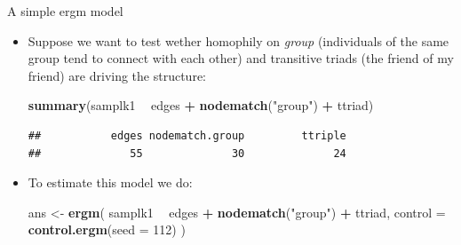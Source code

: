\documentclass[10pt,ignorenonframetext,aspectratio=169,]{beamer}
\newenvironment{Shaded}{\begin{snugshade}}{\end{snugshade}}
\newcommand{\DataTypeTok}[1]{\textcolor[rgb]{0.13,0.29,0.53}{#1}}
\newcommand{\DecValTok}[1]{\textcolor[rgb]{0.00,0.00,0.81}{#1}}
\newcommand{\KeywordTok}[1]{\textcolor[rgb]{0.13,0.29,0.53}{\textbf{#1}}}
\newcommand{\NormalTok}[1]{#1}
\newcommand{\OperatorTok}[1]{\textcolor[rgb]{0.81,0.36,0.00}{\textbf{#1}}}
\newcommand{\StringTok}[1]{\textcolor[rgb]{0.31,0.60,0.02}{#1}}
\begin{document}
\begin{frame}[fragile]{A simple ergm model}
\protect\hypertarget{a-simple-ergm-model}{}

\begin{itemize}
\item
  Suppose we want to test wether homophily on \textit{group}
  (individuals of the same group tend to connect with each other) and
  transitive triads (the friend of my friend) are driving the structure:
  \pause

  \footnotesize

\begin{Shaded}
\begin{Highlighting}[]
\KeywordTok{summary}\NormalTok{(samplk1 }\OperatorTok{~}\StringTok{ }\NormalTok{edges }\OperatorTok{+}\StringTok{ }\KeywordTok{nodematch}\NormalTok{(}\StringTok{"group"}\NormalTok{) }\OperatorTok{+}\StringTok{ }\NormalTok{ttriad)}
\end{Highlighting}
\end{Shaded}

\begin{verbatim}
##           edges nodematch.group         ttriple 
##              55              30              24
\end{verbatim}

  \normalsize
\end{itemize}

\pause

\begin{itemize}
\item
  To estimate this model we do:

  \footnotesize

\begin{Shaded}
\begin{Highlighting}[]
\NormalTok{ans <-}\StringTok{ }\KeywordTok{ergm}\NormalTok{(}
\NormalTok{  samplk1 }\OperatorTok{~}\StringTok{ }\NormalTok{edges }\OperatorTok{+}\StringTok{ }\KeywordTok{nodematch}\NormalTok{(}\StringTok{"group"}\NormalTok{) }\OperatorTok{+}\StringTok{ }\NormalTok{ttriad,}
  \DataTypeTok{control =} \KeywordTok{control.ergm}\NormalTok{(}\DataTypeTok{seed =} \DecValTok{112}\NormalTok{)}
\NormalTok{  )}
\end{Highlighting}
\end{Shaded}

  \normalsize
\end{itemize}

\end{frame}
\end{document}
